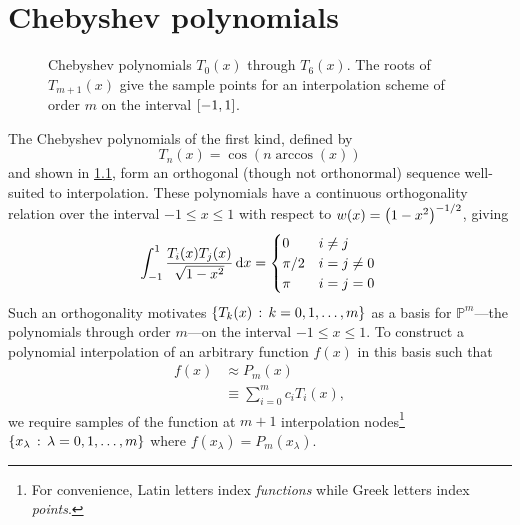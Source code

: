 \chapter{Chebyshev polynomials}

\begin{figure}[h]
  \centering
  \caption{\label{fig:chebyshev polynomials} Chebyshev polynomials $T_0(x)$ through $T_6(x)$.
    The roots of $T_{m + 1}(x)$ give the sample points for an interpolation scheme of order $m$ on the interval $\qty[-1, 1]$.
  }
\end{figure}

The Chebyshev polynomials of the first kind, defined by
\begin{equation}
  T_n(x) = \cos(n \arccos(x))
  \label{eq:chebyshev}
\end{equation}
and shown in \cref{fig:chebyshev polynomials}, form an orthogonal (though not orthonormal) sequence well-suited to interpolation.
These polynomials have a continuous orthogonality relation over the interval $-1 \leqslant x \leqslant 1$ with respect to $w(x) = \qty(1-x^2)^{-1/2}$, giving
\begin{equation}
  \int_{-1}^1 \frac{T_i(x) T_j(x)}{\sqrt{1 - x^2}} \dd{x} =
  \begin{cases}
    0 & i \not = j \\
    \pi / 2 & i = j \not = 0 \\
    \pi & i = j = 0
  \end{cases} \label{eq:continuous orthogonality} \\
\end{equation}
Such an orthogonality motivates $\qty{T_k(x)\, : \, k = 0, 1, \ldots, m}$ as a basis for $\mathbb{P}^m$---the polynomials through order $m$---on the interval $-1 \leqslant x \leqslant 1$.
To construct a polynomial interpolation of an arbitrary function $f(x)$ in this basis such that
\begin{equation}
  \begin{aligned}
    f(x) &\approx P_m(x) \\
    &\equiv \sum_{i = 0}^{m} c_i T_i(x),
  \end{aligned}
  \label{eq:chebyshev expansion}
\end{equation}
we require samples of the function at $m+1$ interpolation nodes\footnote{For convenience, Latin letters index \emph{functions} while Greek letters index \emph{points}.} $\qty{x_\lambda \,:\, \lambda = 0, 1, \ldots, m}$ where $f(x_\lambda) = P_m(x_\lambda)$.
